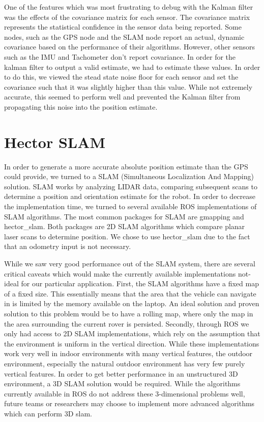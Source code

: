 One of the features which was most frustrating to debug with the Kalman filter was the effects of the covariance matrix for each sensor. The covariance matrix represents the statistical confidence in the sensor data being reported. Some nodes, such as the GPS node and the SLAM node report an actual, dynamic covariance based on the performance of their algorithms. However, other sensors such as the IMU and Tachometer don't report covariance. In order for the kalman filter to output a valid estimate, we had to estimate these values. In order to do this, we viewed the stead state noise floor for each sensor and set the covariance such that it was slightly higher than this value. While not extremely accurate, this seemed to perform well and prevented the Kalman filter from propagating this noise into the position estimate.

\section{Hector SLAM}

In order to generate a more accurate absolute position estimate than the GPS could provide, we turned to a SLAM (Simultaneous Localization And Mapping) solution. SLAM works by analyzing LIDAR data, comparing subsequent scans to determine a position and orientation estimate for the robot. In order to decrease the implementation time, we turned to several available ROS implementations of SLAM algorithms. The most common packages for SLAM are gmapping and hector\_slam. Both packages are 2D SLAM algorithms which compare planar laser scans to determine position. We chose to use hector\_slam due to the fact that an odometry input is not necessary.  

While we saw very good performance out of the SLAM system, there are several critical caveats which would make the currently available implementations not-ideal for our particular application. First, the SLAM algorithms have a fixed map of a fixed size. This essentially means that the area that the vehicle can navigate in is limited by the memory available on the laptop. An ideal solution and proven solution to this problem would be to have a rolling map, where only the map in the area surrounding the current rover is persisted. Secondly, through ROS we only had access to 2D SLAM implementations, which rely on the assumption that the environment is uniform in the vertical direction. While these implementations work very well in indoor environments with many vertical features, the outdoor environment, especially the natural outdoor environment has very few purely vertical features. In order to get better performance in an unstructured 3D environment, a 3D SLAM solution would be required. While the algorithms currently available in ROS do not address these 3-dimensional problems well, future teams or researchers may choose to implement more advanced algorithms which can perform 3D slam.

